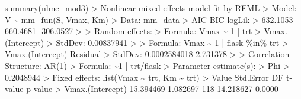 \documentclass[
  letterpaper,
]{book}
\newenvironment{Shaded}{\begin{snugshade}}{\end{snugshade}}
\newcommand{\DecValTok}[1]{\textcolor[rgb]{0.68,0.00,0.00}{#1}}
\newcommand{\ErrorTok}[1]{\textcolor[rgb]{0.68,0.00,0.00}{#1}}
\newcommand{\FloatTok}[1]{\textcolor[rgb]{0.68,0.00,0.00}{#1}}
\newcommand{\FunctionTok}[1]{\textcolor[rgb]{0.28,0.35,0.67}{#1}}
\newcommand{\NormalTok}[1]{\textcolor[rgb]{0.00,0.23,0.31}{#1}}
\newcommand{\SpecialCharTok}[1]{\textcolor[rgb]{0.37,0.37,0.37}{#1}}
\begin{document}
\begin{Shaded}
\begin{Highlighting}[]
\FunctionTok{summary}\NormalTok{(nlme\_mod3)}
\SpecialCharTok{\textgreater{}}\NormalTok{ Nonlinear mixed}\SpecialCharTok{{-}}\NormalTok{effects model fit by REML}
\SpecialCharTok{\textgreater{}}\NormalTok{   Model}\SpecialCharTok{:}\NormalTok{ V }\SpecialCharTok{\textasciitilde{}} \FunctionTok{mm\_fun}\NormalTok{(S, Vmax, Km) }
\SpecialCharTok{\textgreater{}}\NormalTok{   Data}\SpecialCharTok{:}\NormalTok{ mm\_data }
\SpecialCharTok{\textgreater{}}\NormalTok{        AIC      BIC    logLik}
\SpecialCharTok{\textgreater{}}   \FloatTok{632.1053} \FloatTok{660.4681} \SpecialCharTok{{-}}\FloatTok{306.0527}
\SpecialCharTok{\textgreater{}} 
\ErrorTok{\textgreater{}}\NormalTok{ Random effects}\SpecialCharTok{:}
\ErrorTok{\textgreater{}}\NormalTok{  Formula}\SpecialCharTok{:}\NormalTok{ Vmax }\SpecialCharTok{\textasciitilde{}} \DecValTok{1} \SpecialCharTok{|}\NormalTok{ trt}
\SpecialCharTok{\textgreater{}}         \FunctionTok{Vmax.}\NormalTok{(Intercept)}
\SpecialCharTok{\textgreater{}}\NormalTok{ StdDev}\SpecialCharTok{:}       \FloatTok{0.00837941}
\SpecialCharTok{\textgreater{}} 
\ErrorTok{\textgreater{}}\NormalTok{  Formula}\SpecialCharTok{:}\NormalTok{ Vmax }\SpecialCharTok{\textasciitilde{}} \DecValTok{1} \SpecialCharTok{|}\NormalTok{ flask }\SpecialCharTok{\%in\%}\NormalTok{ trt}
\SpecialCharTok{\textgreater{}}         \FunctionTok{Vmax.}\NormalTok{(Intercept) Residual}
\SpecialCharTok{\textgreater{}}\NormalTok{ StdDev}\SpecialCharTok{:}     \FloatTok{0.0002584018} \FloatTok{2.731378}
\SpecialCharTok{\textgreater{}} 
\ErrorTok{\textgreater{}}\NormalTok{ Correlation Structure}\SpecialCharTok{:} \FunctionTok{AR}\NormalTok{(}\DecValTok{1}\NormalTok{)}
\SpecialCharTok{\textgreater{}}\NormalTok{  Formula}\SpecialCharTok{:} \ErrorTok{\textasciitilde{}}\DecValTok{1} \SpecialCharTok{|}\NormalTok{ trt}\SpecialCharTok{/}\NormalTok{flask }
\SpecialCharTok{\textgreater{}}\NormalTok{  Parameter }\FunctionTok{estimate}\NormalTok{(s)}\SpecialCharTok{:}
\ErrorTok{\textgreater{}}\NormalTok{       Phi }
\SpecialCharTok{\textgreater{}} \FloatTok{0.2048944} 
\SpecialCharTok{\textgreater{}}\NormalTok{ Fixed effects}\SpecialCharTok{:}  \FunctionTok{list}\NormalTok{(Vmax }\SpecialCharTok{\textasciitilde{}}\NormalTok{ trt, Km }\SpecialCharTok{\textasciitilde{}}\NormalTok{ trt) }
\SpecialCharTok{\textgreater{}}\NormalTok{                      Value Std.Error  DF   t}\SpecialCharTok{{-}}\NormalTok{value p}\SpecialCharTok{{-}}\NormalTok{value}
\SpecialCharTok{\textgreater{}} \FunctionTok{Vmax.}\NormalTok{(Intercept) }\FloatTok{15.394469}  \FloatTok{1.082697} \DecValTok{118} \FloatTok{14.218627}  \FloatTok{0.0000}

\end{Highlighting}
\end{Shaded}
\end{document}
